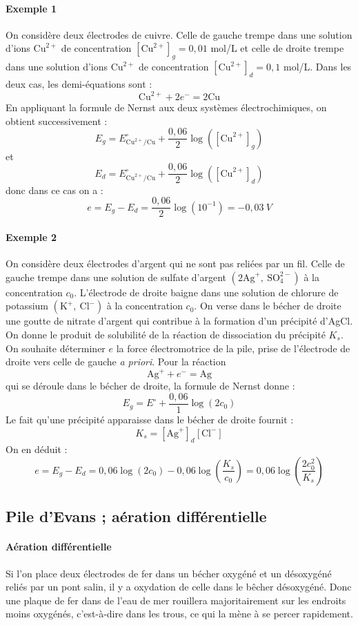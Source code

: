 \documentclass[french]{book}
\theoremstyle{plain}
\theoremstyle{definition}
\theoremstyle{remark}
\newcommand{\inv}{^{-1}}
\begin{document}
\paragraph{Exemple 1} On considère deux électrodes de cuivre. Celle de gauche trempe dans une solution d'ions $\text{Cu}^{2+}$ de concentration $[\text{Cu}^{2+}]_g=0,01$ mol/L et celle de droite trempe dans une solution d'ions $\text{Cu}^{2+}$ de concentration $[\text{Cu}^{2+}]_d=0,1$ mol/L. Dans les deux cas, les demi-équations sont : $$\text{Cu}^{2+}+2e^-=2\text{Cu}$$ En appliquant la formule de Nernst aux deux systèmes électrochimiques, on obtient successivement : $$E_g=E_{\text{Cu}^{2+}/\text{Cu}}^\circ+\frac{0,06}{2}\log\left([\text{Cu}^{2+}]_g\right)$$ et $$E_d=E_{\text{Cu}^{2+}/\text{Cu}}^\circ+\frac{0,06}{2}\log\left([\text{Cu}^{2+}]_d\right)$$ donc dans ce cas on a : $$e=E_g-E_d=\frac{0,06}{2}\log(10\inv)=-0,03\ V$$

\paragraph{Exemple 2} On considère deux électrodes d'argent qui ne sont pas reliées par un fil. Celle de gauche trempe dans une solution de sulfate d'argent $(2\text{Ag}^+,\ \text{SO}_4^{2-})$ à la concentration $c_0$. L'électrode de droite baigne dans une solution de chlorure de potassium $(\text{K}^+,\ \text{Cl}^-)$ à la concentration $c_0$. On verse dans le bécher de droite une goutte de nitrate d'argent qui contribue à la formation d'un précipité d'AgCl. On donne le produit de solubilité de la réaction de dissociation du précipité $K_s$. On souhaite déterminer $e$ la force électromotrice de la pile, prise de l'électrode de droite vers celle de gauche \textit{a priori}. Pour la réaction $$\text{Ag}^++e^-=\text{Ag}$$ qui se déroule dans le bécher de droite, la formule de Nernst donne : $$E_g=E^\circ+\frac{0,06}{1}\log(2c_0)$$ Le fait qu'une précipité apparaisse dans le bécher de droite fournit : $$K_s=[\text{Ag}^+]_d[\text{Cl}^-]$$ On en déduit : $$e=E_g-E_d=0,06\log(2c_0)-0,06\log\left(\frac{K_s}{c_0}\right)=0,06\log\left(\frac{2c_0^2}{K_s}\right)$$

\subsection{Pile d'Evans ; aération différentielle}

\paragraph{Aération différentielle} Si l’on place deux électrodes de fer dans un bécher oxygéné et un désoxygéné reliés par un pont salin, il y a oxydation de celle dans le bêcher désoxygéné. Donc une plaque de fer dans de l’eau de mer rouillera majoritairement sur les endroits moins oxygénés, c'est-à-dire dans les trous, ce qui la mène à se percer rapidement.
\end{document}
